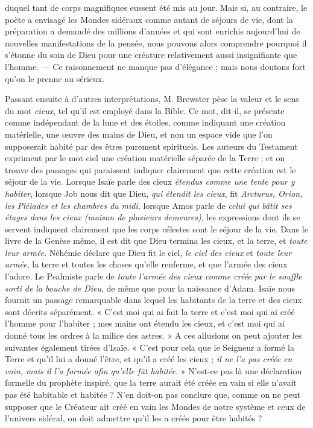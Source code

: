 \documentclass[a4paper, 11pt, oneside, landscape]{article}
\begin{document}
duquel tant de corps magnifiques eussent été mis au jour. Mais si, au contraire, le poète a envisagé les Mondes sidéraux comme autant de séjours de vie, dont la préparation a demandé des millions d'années et qui sont enrichis aujourd'hui de nouvelles manifestations de la pensée, nous pouvons alors comprendre pourquoi il s'étonne du soin de Dieu pour une créature relativement aussi insignifiante que l'homme. --- Ce raisonnement ne manque pas d'élégance ; mais nous doutons fort qu'on le prenne au sérieux.

Passant ensuite à d'autres interprétations, M. Brewster pèse la valeur et le sens du mot \emph{cieux}, tel qu'il est employé dans la Bible. Ce mot, dit-il, se présente comme indépendant de la lune et des étoiles, comme indiquant une création matérielle, une œuvre des mains de Dieu, et non un espace vide que l'on supposerait habité par des êtres purement spirituels. Les auteurs du Testament expriment par le mot ciel une création matérielle séparée de la Terre ; et on trouve des passages qui paraissent indiquer clairement que cette création est le séjour de la vie. Lorsque Isaïe parle des cieux \emph{étendus comme une tente pour y habiter}, lorsque Job nous dit que Dieu, \emph{qui étendit les cieux}, fit \emph{Arcturus, Orion, les Pléiades et les chambres du midi}, lorsque Amos parle de \emph{celui qui bâtit ses étages dans les cieux (maison de plusieurs demeures)}, les expressions dont ils se servent indiquent clairement que les corps célestes sont le séjour de la vie. Dans le livre de la Genèse même, il est dit que Dieu termina les cieux, et la terre, et \emph{toute leur armée}. Néhémie déclare que Dieu fit le ciel, \emph{le ciel des cieux} et \emph{toute leur armée}, la terre et toutes les choses qu'elle renferme, et que l'armée des cieux l'adore. Le Psalmiste parle de \emph{toute l'armée des cieux comme créée par le souffle sorti de la bouche de Dieu}, de même que pour la naissance d'Adam. Isaïe nous fournit un passage remarquable dans lequel les habitants de la terre et des cieux sont décrits séparément. « C'est moi qui ai fait la terre et c'est moi qui ai créé l'homme pour l'habiter ; mes mains ont étendu les cieux, et c'est moi qui ai donné tous les ordres à la milice des astres. » A ces allusions on peut ajouter les suivantes également tirées d'Isaïe. « C'est pour cela que le Seigneur a formé la Terre et qu'il lui a donné l'être, et qu'il a créé les cieux ; \emph{il ne l'a pas créée en vain, mais il l'a formée afin qu'elle fût habitée}. » N'est-ce pas là une déclaration formelle du prophète inspiré, que la terre aurait été créée en vain si elle n'avait pas été habitable et habitée ? N'en doit-on pas conclure que, comme on ne peut supposer que le Créateur ait créé en vain les Mondes de notre système et ceux de l'univers sidéral, on doit admettre qu'il les a créés pour être habités ?
\end{document}
